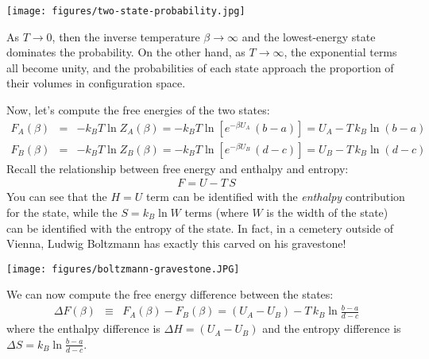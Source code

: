 \documentclass[english,course]{lecture}
\begin{document}
\begin{centering}
\texttt{[image: figures/two-state-probability.jpg]}

\end{centering}

As $T \rightarrow 0$, then the inverse temperature $\beta \rightarrow \infty$ and the lowest-energy state dominates the probability.
On the other hand, as $T \rightarrow \infty$, the exponential terms all become unity, and the probabilities of each state approach the proportion of their volumes in configuration space.

Now, let's compute the free energies of the two states:
\begin{eqnarray}
F_A(\beta) &=& - k_B T \ln Z_A(\beta) = - k_B T \ln \left[ e^{-\beta U_A} \, (b-a) \right] = U_A - T \, k_B  \ln (b-a)  \\
F_B(\beta) &=& - k_B T \ln Z_B(\beta) = - k_B T \ln \left[ e^{-\beta U_B} \, (d-c) \right] = U_B - T \, k_B \ln (d-c)
\end{eqnarray}
Recall the relationship between free energy and enthalpy and entropy:
\begin{eqnarray}
F = U - T \, S
\end{eqnarray}
You can see that the $H = U$ term can be identified with the \emph{enthalpy} contribution for the state, while the $S = k_B \ln W$ terms (where $W$ is the width of the state) can be identified with the entropy of the state.
In fact, in a cemetery outside of Vienna, Ludwig Boltzmann has exactly this carved on his gravestone!

\begin{centering}
\texttt{[image: figures/boltzmann-gravestone.JPG]}

\end{centering}

We can now compute the free energy difference between the states:
\begin{eqnarray}
\Delta F(\beta) &\equiv& F_A(\beta) - F_B(\beta) = (U_A - U_B) - T \, k_B \ln \frac{b-a}{d-c}
\end{eqnarray}
where the enthalpy difference is $\Delta H = (U_A - U_B)$ and the entropy difference is $\Delta S = k_B \ln \frac{b-a}{d-c}$.
\end{document}
